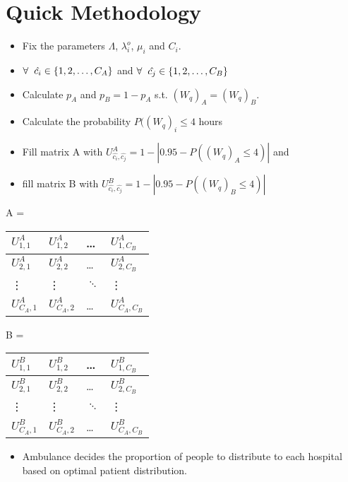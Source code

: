 \section{Quick Methodology}

\begin{itemize}
    \item Fix the parameters \( \Lambda \), \( \lambda_i^o \), \( \mu_i \) and \( C_i \). 
    \item \( \forall \hspace{0.2cm} \hat{c_i} \in \{1,2, \dots, C_A\} \) and \( \forall \hspace{0.2cm} \hat{c_j} \in \{1,2, \dots, C_B\} \) 
    \item Calculate \( p_A \) and \( p_B = 1-p_A \) s.t. \( (W_q)_A = (W_q)_B \). 
    \item Calculate the probability \(P((W_q)_i \leq 4 \) hours
    \item Fill matrix A with \( U_{\hat{c_i}, \hat{c_j}}^A = 1 - |0.95 - P((W_q)_A \leq 4)| \) and
    \item fill matrix B with \( U_{\hat{c_i}, \hat{c_j}}^B = 1 - |0.95 - P((W_q)_B \leq 4)| \)
\end{itemize}


\begin{table}[h]
    \centering
    A = 
    \begin{tabular}{|l|l|l|l|}
    \hline
    \( U_{1,1}^A \) & \( U_{1,2}^A \) & \dots & \( U_{1,C_B}^A \) \\ \hline
    \( U_{2,1}^A \) & \( U_{2,2}^A \) & \dots & \( U_{2,C_B}^A \) \\ \hline
    \vdots & \vdots & \( \ddots \) & \vdots \\ \hline
    \( U_{C_A,1}^A \) & \( U_{C_A,2}^A \) & \dots & \( U_{C_A,C_B}^A \) \\ \hline
    \end{tabular}
\end{table}  

\begin{table}[h]
    \centering
    B = 
    \begin{tabular}{|l|l|l|l|}
    \hline
    \( U_{1,1}^B \) & \( U_{1,2}^B \) & \dots & \( U_{1,C_B}^B \) \\ \hline
    \( U_{2,1}^B \) & \( U_{2,2}^B \) & \dots & \( U_{2,C_B}^B \) \\ \hline
    \vdots & \vdots & \( \ddots \) & \vdots \\ \hline
    \( U_{C_A,1}^B \) & \( U_{C_A,2}^B \) & \dots & \( U_{C_A,C_B}^B \) \\ \hline
    \end{tabular}
\end{table}  

\begin{itemize}
    \item Ambulance decides the proportion of people to distribute to each hospital based on optimal patient distribution.
\end{itemize}

